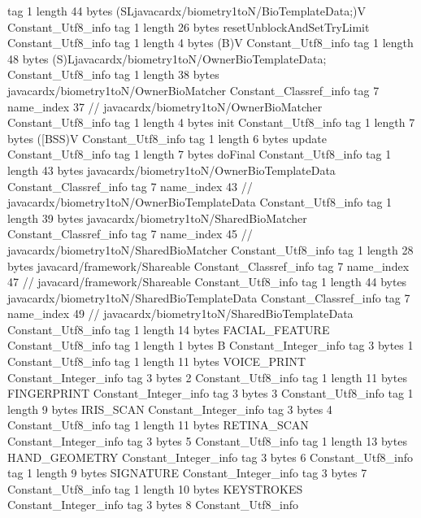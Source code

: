 {{{			tag	1
			length	44
			bytes	(SLjavacardx/biometry1toN/BioTemplateData;)V
		}
		Constant_Utf8_info {
			tag	1
			length	26
			bytes	resetUnblockAndSetTryLimit
		}
		Constant_Utf8_info {
			tag	1
			length	4
			bytes	(B)V
		}
		Constant_Utf8_info {
			tag	1
			length	48
			bytes	(S)Ljavacardx/biometry1toN/OwnerBioTemplateData;
		}
		Constant_Utf8_info {
			tag	1
			length	38
			bytes	javacardx/biometry1toN/OwnerBioMatcher
		}
		Constant_Classref_info {
			tag	7
			name_index	37		// javacardx/biometry1toN/OwnerBioMatcher
		}
		Constant_Utf8_info {
			tag	1
			length	4
			bytes	init
		}
		Constant_Utf8_info {
			tag	1
			length	7
			bytes	([BSS)V
		}
		Constant_Utf8_info {
			tag	1
			length	6
			bytes	update
		}
		Constant_Utf8_info {
			tag	1
			length	7
			bytes	doFinal
		}
		Constant_Utf8_info {
			tag	1
			length	43
			bytes	javacardx/biometry1toN/OwnerBioTemplateData
		}
		Constant_Classref_info {
			tag	7
			name_index	43		// javacardx/biometry1toN/OwnerBioTemplateData
		}
		Constant_Utf8_info {
			tag	1
			length	39
			bytes	javacardx/biometry1toN/SharedBioMatcher
		}
		Constant_Classref_info {
			tag	7
			name_index	45		// javacardx/biometry1toN/SharedBioMatcher
		}
		Constant_Utf8_info {
			tag	1
			length	28
			bytes	javacard/framework/Shareable
		}
		Constant_Classref_info {
			tag	7
			name_index	47		// javacard/framework/Shareable
		}
		Constant_Utf8_info {
			tag	1
			length	44
			bytes	javacardx/biometry1toN/SharedBioTemplateData
		}
		Constant_Classref_info {
			tag	7
			name_index	49		// javacardx/biometry1toN/SharedBioTemplateData
		}
		Constant_Utf8_info {
			tag	1
			length	14
			bytes	FACIAL_FEATURE
		}
		Constant_Utf8_info {
			tag	1
			length	1
			bytes	B
		}
		Constant_Integer_info {
			tag	3
			bytes	1
		}
		Constant_Utf8_info {
			tag	1
			length	11
			bytes	VOICE_PRINT
		}
		Constant_Integer_info {
			tag	3
			bytes	2
		}
		Constant_Utf8_info {
			tag	1
			length	11
			bytes	FINGERPRINT
		}
		Constant_Integer_info {
			tag	3
			bytes	3
		}
		Constant_Utf8_info {
			tag	1
			length	9
			bytes	IRIS_SCAN
		}
		Constant_Integer_info {
			tag	3
			bytes	4
		}
		Constant_Utf8_info {
			tag	1
			length	11
			bytes	RETINA_SCAN
		}
		Constant_Integer_info {
			tag	3
			bytes	5
		}
		Constant_Utf8_info {
			tag	1
			length	13
			bytes	HAND_GEOMETRY
		}
		Constant_Integer_info {
			tag	3
			bytes	6
		}
		Constant_Utf8_info {
			tag	1
			length	9
			bytes	SIGNATURE
		}
		Constant_Integer_info {
			tag	3
			bytes	7
		}
		Constant_Utf8_info {
			tag	1
			length	10
			bytes	KEYSTROKES
		}
		Constant_Integer_info {
			tag	3
			bytes	8
		}
		Constant_Utf8_info {
}}}
